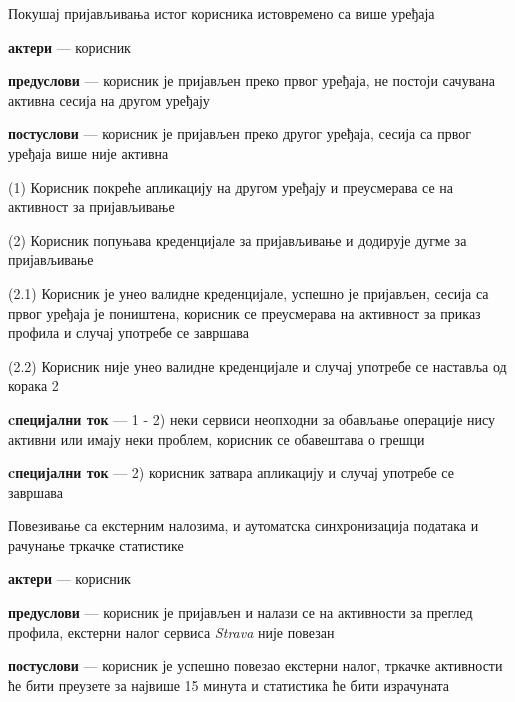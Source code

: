 \documentclass[12pt,oneside]{memoir}
\begin{document}
\begin{itemize}
\begin{description}
        \end{description}
    \item Покушај пријављивања истог корисника истовремено са више уређаја
        \begin{description}
            \item \textbf{актери} --- корисник
            \item \textbf{предуслови} --- корисник је пријављен преко првог уређаја, не постоји сачувана активна сесија на другом уређају
            \item \textbf{постуслови} --- корисник је пријављен преко другог уређаја, сесија са првог уређаја више није активна
            \item (1) Корисник покреће апликацију на другом уређају и преусмерава се на активност за пријављивање
            \item (2) Корисник попуњава креденцијале за пријављивање и додирује дугме за пријављивање
            \begin{description}
                \item (2.1) Корисник је унео валидне креденцијале, успешно је пријављен, сесија са првог уређаја је поништена, корисник се преусмерава на активност за приказ профила и случај употребе се завршава
                \item (2.2) Корисник није унео валидне креденцијале и случај употребе се наставља од корака 2
            \end{description}
            \item \textbf{cпецијални ток} --- 1 - 2) неки сервиси неопходни за обављање операције нису активни или имају неки проблем, корисник се обавештава о грешци
            \item \textbf{cпецијални ток} --- 2) корисник затвара апликацију и случај употребе се завршава 
        \end{description}
    \item Повезивање са екстерним налозима, и аутоматска синхронизација података и рачунање тркачке статистике
        \begin{description}
            \item \textbf{актери} --- корисник
            \item \textbf{предуслови} --- корисник је пријављен и налази се на активности за преглед профила, екстерни налог сервиса \textit{Strava} није повезан
            \item \textbf{постуслови} --- корисник је успешно повезао екстерни налог, тркачке активности ће бити преузете за највише 15 минута и статистика ће бити израчуната

\end{description}
\end{itemize}
\end{document}
